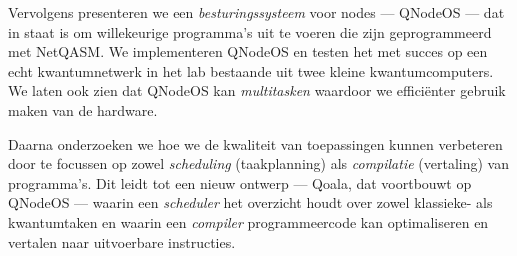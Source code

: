 {Vervolgens presenteren we een \emph{besturingssysteem} voor nodes --- QNodeOS --- dat in staat is om willekeurige programma's uit te voeren die zijn geprogrammeerd met NetQASM.
We implementeren QNodeOS en testen het met succes op een echt kwantumnetwerk in het lab bestaande uit twee kleine kwantumcomputers.
We laten ook zien dat QNodeOS kan \emph{multitasken} waardoor we efficiënter gebruik maken van de hardware.

Daarna onderzoeken we hoe we de kwaliteit van toepassingen kunnen verbeteren door te focussen op zowel \emph{scheduling} (taakplanning) als \emph{compilatie} (vertaling) van programma's.
Dit leidt tot een nieuw ontwerp --- Qoala, dat voortbouwt op QNodeOS --- waarin een \emph{scheduler} het overzicht houdt over zowel klassieke- als kwantumtaken en waarin een \emph{compiler} programmeercode kan optimaliseren en vertalen naar uitvoerbare instructies.


}
